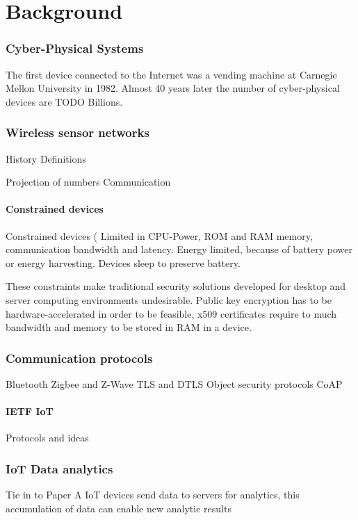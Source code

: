 \chapter{Background}
\subsection{Cyber-Physical Systems}
The first device connected to the Internet was a vending machine at Carnegie Mellon University in 1982. Almost 40 years later the number of cyber-physical devices are TODO Billions. 

\subsection{Wireless sensor networks}
History
Definitions

Projection of numbers
Communication

\subsubsection{Constrained devices}
Constrained devices (\cite{rfc7228}
Limited in CPU-Power, ROM and RAM memory, communication bandwidth and latency. Energy limited, because of battery power or energy harvesting.
Devices sleep to preserve battery.

These constraints make traditional security solutions developed for desktop and server computing environments undesirable. Public key encryption has to be hardware-accelerated in order to be feasible, x509 certificates require to much bandwidth and memory to be stored in RAM in a device. 


\subsection{Communication protocols}
Bluetooth
Zigbee and Z-Wave
TLS and DTLS
Object security protocols
CoAP

\subsubsection{IETF IoT}
Protocols and ideas

\subsection{IoT Data analytics}
Tie in to Paper A
IoT devices send data to servers for analytics, this accumulation of data can enable new analytic results 

